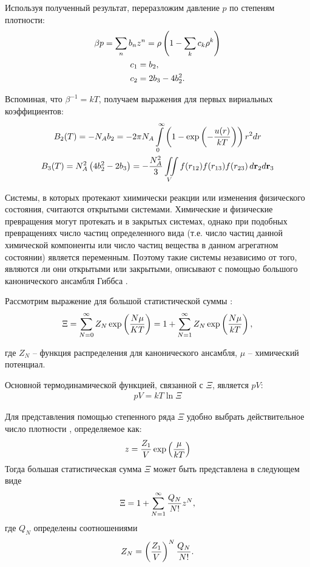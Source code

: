 Используя полученный результат, переразложим давление $p$ по степеням плотности:
\vverh
\begin{gather}
	\beta p = \sum_n b_n z^n = \rho \left( 1 - \sum_k c_k \rho^k \right) \notag \\
	\begin{aligned}
		c_1 &= b_2, \\
		c_2 &= 2 b_3 - 4 b_2^2.
	\end{aligned} \notag
\end{gather}


Вспоминая, что $\beta^{-1} = kT$, получаем выражения для первых вириальных коэффициентов:
\vverh
\begin{gather}
	B_2(T) = - N_A b_2 = - 2 \pi N_A \int\limits_0^\infty \left( 1 - \exp \left( -\frac{u(r)}{kT} \right) \right) r^2 d r \notag  \\
	B_3(T) = N_A^2 \left( 4 b_2^2 - 2 b_3 \right) = - \frac{N_A^2}{3} \iint\limits_V f(r_{12}) f(r_{13}) f(r_{23}) \, d \mathbf{r}_2 d \mathbf{r}_3 \notag
\end{gather}


\iffalse
\newpage
Системы, в которых протекают хиимически реакции или изменения физического состояния, считаются открытыми системами. Химические и физические превращения могут протекать и в закрытых системах, однако при подобных превращениях число частиц определенного вида (т.е. число частиц данной химической компоненты или число частиц вещества в данном агрегатном состоянии) является переменным. Поэтому такие системы независимо от того, являются ли они открытыми или закрытыми, описывают с помощью большого канонического ансамбля Гиббса \cite{hirsch}. \par 
Рассмотрим выражение для большой статистической суммы \cite{meyson}:
\vverh
\begin{gather}
	\Xi = \sum_{N=0}^\infty Z_N \exp \left( \frac{N \mu}{K T} \right) = 1 + \sum_{N=1}^\infty Z_N \exp \left( \frac{N \mu}{k T} \right), \notag 
\end{gather}

где $Z_N$ -- функция распределения для канонического ансамбля, $\mu$ -- химический потенциал. \par
Основной термодинамической функцией, связанной с $\Xi$, является $pV$:
\vverh
\begin{gather}
	p V = kT \ln \Xi \label{pvfromxi}
\end{gather}

Для представления помощью степенного ряда  $\Xi$ удобно выбрать действительное число плотности \cite{rowlin1964}, определяемое как:
\vverh
\begin{gather}
	z = \frac{Z_1}{V} \exp \left( \frac{\mu}{k T} \right) \notag
\end{gather}
Тогда большая статистическая сумма $\Xi$ может быть представлена в следующем виде
\vverh
\begin{gather}
	\Xi = 1 + \sum_{N=1}^\infty \frac{Q_N}{N!} z^N, \notag
\end{gather}
где $Q_N$ определены соотношениями
\vverh
\begin{gather}
	Z_N = \left( \frac{Z_1}{V} \right)^N \frac{Q_N}{N!} . \notag
\end{gather}

